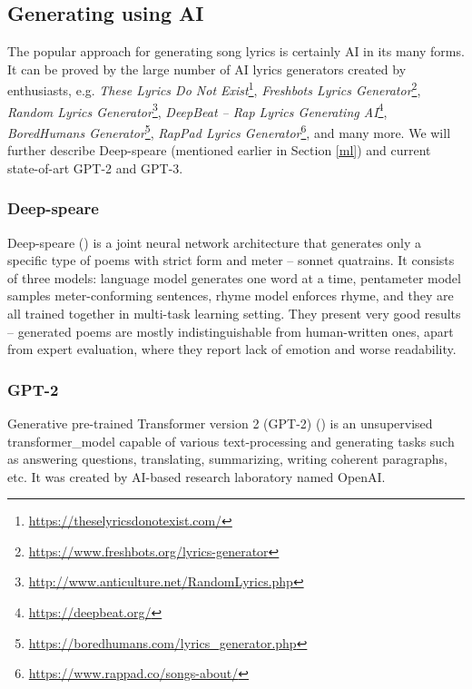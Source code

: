 \subsection{Generating using AI}
The popular approach for generating song lyrics is certainly AI in its many forms. It can be proved by the large number of AI lyrics generators created by enthusiasts, e.g. \textit{These Lyrics Do Not Exist}\footnote{\url{https://theselyricsdonotexist.com/}}, \textit{Freshbots Lyrics Generator}\footnote{\url{https://www.freshbots.org/lyrics-generator}}, \textit{Random Lyrics Generator}\footnote{\url{http://www.anticulture.net/RandomLyrics.php}}, \textit{DeepBeat -- Rap Lyrics Generating AI}\footnote{\url{https://deepbeat.org/}}, \textit{BoredHumans Generator}\footnote{\url{https://boredhumans.com/lyrics_generator.php}}, \textit{RapPad Lyrics Generator}\footnote{\url{https://www.rappad.co/songs-about/}}, and many more. We will further describe Deep-speare (mentioned earlier in Section \ref{ml}) and current state-of-art GPT-2 and GPT-3.

\subsubsection*{Deep-speare}
Deep-speare (\cite{lau2018deep}) is a joint neural network architecture that generates only a specific type of poems with strict form and meter -- \gls{sonnet} \gls{quatrain}s. It consists of three models: language model generates one word at a time, pentameter model samples meter-conforming sentences, rhyme model enforces rhyme, and they are all trained together in multi-task learning setting. They present very good results -- generated poems are mostly indistinguishable from human-written ones, apart from expert evaluation, where they report lack of emotion and worse readability.

\subsubsection*{GPT-2}
Generative pre-trained Transformer version 2 (GPT-2) (\cite{radford2019gpt2}) is an unsupervised \gls{transformer_model} capable of various text-processing and generating tasks such as answering questions, translating, summarizing, writing coherent paragraphs, etc. It was created by AI-based research laboratory named OpenAI.

